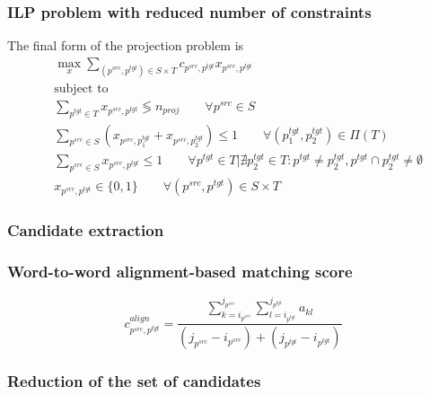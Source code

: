 \documentclass{beamer}
\newcommand{\src}[1]{#1^{src}}
\newcommand{\tgt}[1]{#1^{tgt}}
\begin{document}
\begin{frame}
  \frametitle{ILP problem with reduced number of constraints}
  The final form of the projection problem is
  \begin{align*}
    & \max\limits_x \sum\limits_{(\src{p}, \tgt{p}) \in S \times T} c_{\src{p}, \tgt{p}} x_{\src{p}, \tgt{p}}                                                                                                                       \\
    & \text{subject to}                                                                                                                                                                                                             \\
    & \sum\limits_{\tgt{p} \in T} x_{\src{p}, \tgt{p}} \lessgtr n_{proj}
    \qquad \forall \src{p} \in S                                                                                               \\
    & \sum\limits_{\src{p} \in S} (x_{\src{p}, \tgt{p_1}} + x_{\src{p}, \tgt{p_2}}) \leq 1
    \qquad \forall (\tgt{p_1}, \tgt{p_2}) \in \Pi(T)                                                                           \\
    & \sum\limits_{\src{p} \in S} x_{\src{p}, \tgt{p}} \leq 1
    \qquad \forall \tgt{p} \in T \Big| \nexists \tgt{p_2} \in T: \tgt{p} \neq \tgt{p_2}, \tgt{p} \cap \tgt{p_2} \neq \emptyset \\
    & x_{\src{p}, \tgt{p}} \in \{ 0, 1 \}
    \qquad \forall (\src{p}, \tgt{p}) \in S \times T
  \end{align*}
\end{frame}

\begin{frame}
  \frametitle{Candidate extraction}
\end{frame}

\begin{frame}
  \frametitle{Word-to-word alignment-based matching score}

  \begin{equation*}
    c_{\src{p}, \tgt{p}}^{align} =
    \frac{\sum\limits_{k=i_{\src{p}}}^{j_{\src{p}}} \sum\limits_{l=i_{\tgt{p}}}^{j_{\tgt{p}}} a_{kl}}
    {(j_{\src{p}} - i_{\src{p}}) + (j_{\tgt{p}} - i_{\tgt{p}})}
  \end{equation*}
\end{frame}

\begin{frame}
  \frametitle{Reduction of the set of candidates}
\end{frame}
\end{document}
